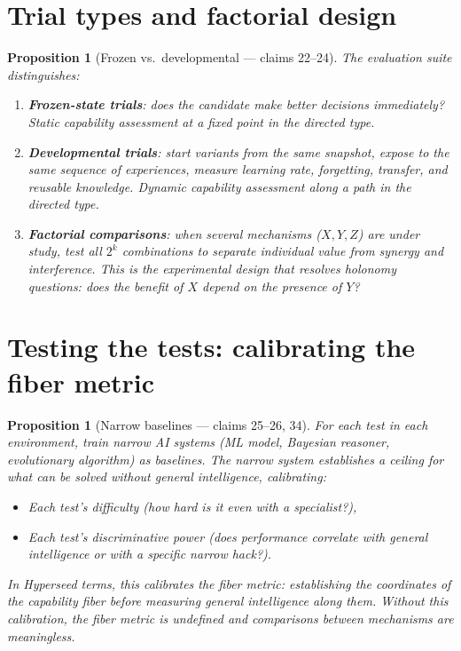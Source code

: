 \documentclass[11pt,a4paper]{article}
\newtheorem{proposition}[definition]{Proposition}
\begin{document}

\section{Trial types and factorial design}
\label{sec:trials}

\begin{proposition}[Frozen vs.\ developmental --- claims 22--24]
\label{prop:trials}
The evaluation suite distinguishes:
\begin{enumerate}
\item \textbf{Frozen-state trials}: does the candidate make better
  decisions immediately? Static capability assessment at a fixed
  point in the directed type.
\item \textbf{Developmental trials}: start variants from the same
  snapshot, expose to the same sequence of experiences, measure
  learning rate, forgetting, transfer, and reusable knowledge. Dynamic
  capability assessment along a path in the directed type.
\item \textbf{Factorial comparisons}: when several mechanisms ($X, Y, Z$)
  are under study, test all $2^k$ combinations to separate individual
  value from synergy and interference. This is the experimental design
  that resolves holonomy questions: does the benefit of $X$ depend on
  the presence of $Y$?
\end{enumerate}
\end{proposition}


\section{Testing the tests: calibrating the fiber metric}
\label{sec:calibration}

\begin{proposition}[Narrow baselines --- claims 25--26, 34]
\label{prop:baselines}
For each test in each environment, train narrow AI systems (ML model,
Bayesian reasoner, evolutionary algorithm) as baselines. The narrow
system establishes a ceiling for what can be solved without general
intelligence, calibrating:
\begin{itemize}
\item Each test's difficulty (how hard is it even with a specialist?),
\item Each test's discriminative power (does performance correlate with
  general intelligence or with a specific narrow hack?).
\end{itemize}
In Hyperseed terms, this calibrates the fiber metric: establishing the
coordinates of the capability fiber before measuring general intelligence
along them. Without this calibration, the fiber metric is undefined and
comparisons between mechanisms are meaningless.
\end{proposition}
\end{document}
